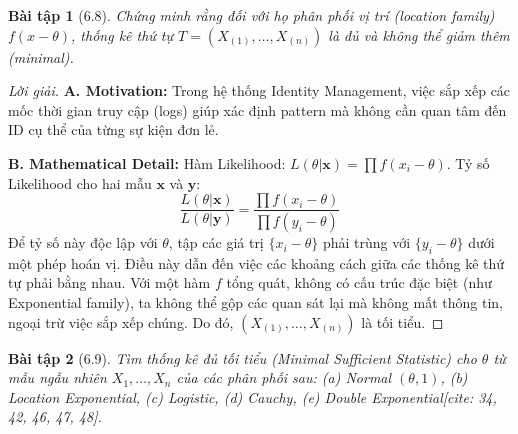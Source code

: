 \documentclass[8pt,a4paper]{article}
\newtheorem{exercise}{Bài tập}
\newenvironment{solution}{\begin{proof}[Lời giải]}{\end{proof}}
\begin{document}
\begin{exercise}[6.8]
Chứng minh rằng đối với họ phân phối vị trí (location family) $f(x-\theta)$, thống kê thứ tự $T = (X_{(1)}, \dots, X_{(n)})$ là đủ và không thể giảm thêm (minimal).
\end{exercise}

\begin{solution}
\textbf{A. Motivation:} Trong hệ thống Identity Management, việc sắp xếp các mốc thời gian truy cập (logs) giúp xác định pattern mà không cần quan tâm đến ID cụ thể của từng sự kiện đơn lẻ.

\textbf{B. Mathematical Detail:}
Hàm Likelihood: $L(\theta|\mathbf{x}) = \prod f(x_i - \theta)$. 
Tỷ số Likelihood cho hai mẫu $\mathbf{x}$ và $\mathbf{y}$:
\[ \frac{L(\theta|\mathbf{x})}{L(\theta|\mathbf{y})} = \frac{\prod f(x_i - \theta)}{\prod f(y_i - \theta)} \]
Để tỷ số này độc lập với $\theta$, tập các giá trị $\{x_i - \theta\}$ phải trùng với $\{y_i - \theta\}$ dưới một phép hoán vị. Điều này dẫn đến việc các khoảng cách giữa các thống kê thứ tự phải bằng nhau. Với một hàm $f$ tổng quát, không có cấu trúc đặc biệt (như Exponential family), ta không thể gộp các quan sát lại mà không mất thông tin, ngoại trừ việc sắp xếp chúng. Do đó, $(X_{(1)}, \dots, X_{(n)})$ là tối tiểu.
\end{solution}

\begin{exercise}[6.9]
Tìm thống kê đủ tối tiểu (Minimal Sufficient Statistic) cho $\theta$ từ mẫu ngẫu nhiên $X_1, \dots, X_n$ của các phân phối sau:
(a) Normal $(\theta, 1)$, (b) Location Exponential, (c) Logistic, (d) Cauchy, (e) Double Exponential[cite: 34, 42, 46, 47, 48].
\end{exercise}
\end{document}
